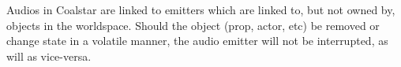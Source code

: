 Audios in Coalstar are linked to emitters which are linked to, but not owned by, objects in the worldspace. Should the object (prop, actor, etc) be removed or change state in a volatile manner, the audio emitter will not be interrupted, as will as vice-versa.